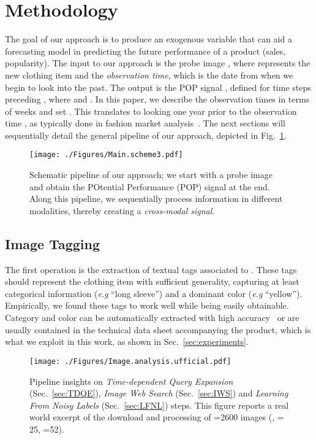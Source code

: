 \documentclass[runningheads]{llncs}
\newcommand{\snamebig}[0] {POP\xspace}
\begin{document}
\section{Methodology}
\label{sec:method}
\sloppy The goal of our approach is to produce an exogenous variable that can aid a forecasting model in predicting the future performance of a product (sales, popularity). The input to our approach is the probe image , where  represents the new clothing item and  the \emph{observation time}, which is the date from when we begin to look into the past. The output is the \snamebig signal , defined for  time steps preceding , where  and . In this paper, we describe the observation times in terms of weeks and set . This translates to looking one year prior to the observation time , as typically done in fashion market analysis~\cite{sorger2017fundamentals}. The next sections will sequentially detail the general pipeline of our approach, depicted in Fig.~\ref{fig:Main.scheme2}.

\begin{figure}[t!]
	\centering
	\texttt{[image: ./Figures/Main.scheme3.pdf]}	
	\caption{\footnotesize Schematic pipeline of our approach; we start with a probe image and obtain the POtential Performance (\snamebig) signal at the end. Along this pipeline, we sequentially process information in different modalities, thereby creating a \textit{cross-modal signal}.}
	\label{fig:Main.scheme2}
\end{figure}

\subsection{Image Tagging} The first operation is the extraction of textual tags  associated to . These tags should represent the clothing item with sufficient generality, capturing at least categorical information (\textit{e.g} ``long sleeve'') and a dominant color (\textit{e.g}  ``yellow''). Empirically, we found these tags to work well while being easily obtainable. Category and color can be automatically extracted with high accuracy~\cite{liuLQWTcvpr16DeepFashion} or are usually contained in the technical data sheet accompanying the product, which is what we exploit in this work, as shown in Sec.~\ref{sec:experiments}.

\begin{figure}[t!]
	\centering
	\texttt{[image: ./Figures/Image.analysis.ufficial.pdf]}
	\caption{\footnotesize Pipeline insights on \emph{Time-dependent Query Expansion} (Sec.~\ref{sec:TDQE}), \emph{Image Web Search} (Sec.~\ref{sec:IWS}) and \emph{Learning From Noisy Labels} (Sec.~\ref{sec:LFNL}) steps. This figure reports a real world excerpt of the download and processing of =2600 images (,  = 25, =52).}
	\label{fig:Image.analysis.ufficial}
\end{figure}
\end{document}
